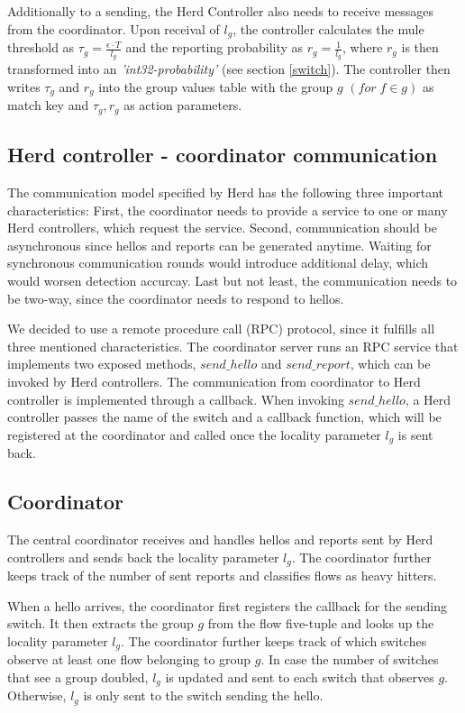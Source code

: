 \documentclass[11pt,oneside,a4paper]{article}
\begin{document}
\noindent Additionally to a sending, the Herd Controller also needs to receive messages from the coordinator. Upon receival of $l_g$, the controller calculates the mule threshold as $\tau_g = \frac{\epsilon \cdot T}{l_g}$ and the reporting probability as $r_g = \frac{1}{l_g}$, where $r_g$ is then transformed into an \textit{'int32-probability'} (see section \ref{switch}). The controller then writes $\tau_g$ and $r_g$ into the group values table with the group $g$ $(for \; f \in g)$ as match key and $\tau_g, r_g$ as action parameters.


\subsection{Herd controller - coordinator communication} \label{communication}

The communication model specified by Herd has the following three important characteristics: First, the coordinator needs to provide a service to one or many Herd controllers, which request the service. Second, communication should be asynchronous since hellos and reports can be generated anytime. Waiting for synchronous communication rounds would introduce additional delay, which would worsen detection accurcay. Last but not least, the communication needs to be two-way, since the coordinator needs to respond to hellos.

We decided to use a remote procedure call (RPC) protocol, since it fulfills all three mentioned characteristics. The coordinator server runs an RPC service that implements two exposed methods, $send\_hello$ and $send\_report$, which can be invoked by Herd controllers. The communication from coordinator to Herd controller is implemented through a callback. When invoking $send\_hello$, a Herd controller passes the name of the switch and a callback function, which will be registered at the coordinator and called once the locality parameter $l_g$ is sent back.
 

\subsection{Coordinator} \label{coordinator}
The central coordinator receives and handles hellos and reports sent by Herd controllers and sends back the locality parameter $l_g$. The coordinator further keeps track of the number of sent reports and classifies flows as heavy hitters.

\noindent When a hello arrives, the coordinator first registers the callback for the sending switch. It then extracts the group $g$ from the flow five-tuple and looks up the locality parameter $l_g$. The coordinator further keeps track of which switches observe at least one flow belonging to group $g$. In case the number of switches that see a group doubled, $l_g$ is updated and sent to each switch that observes $g$. Otherwise, $l_g$ is only sent to the switch sending the hello.
\end{document}
